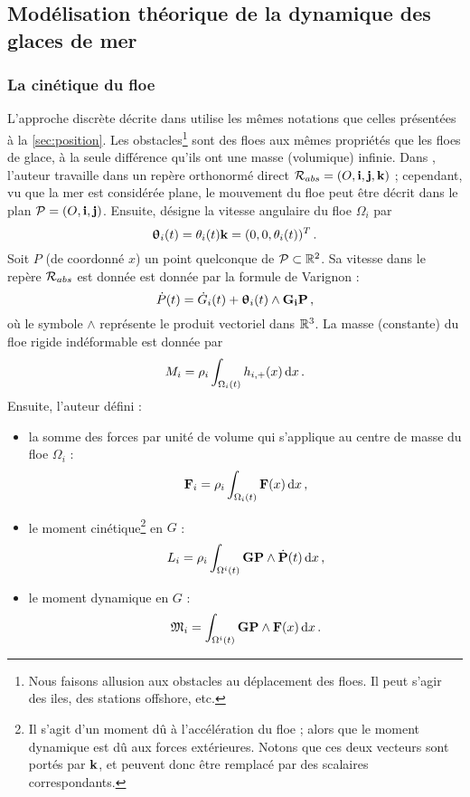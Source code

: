 \subsection{Modélisation théorique de la dynamique des glaces de mer}

\subsubsection{La cinétique du floe}

L'approche discrète décrite dans \parencite{rabatel2015thesis} utilise les mêmes notations que celles présentées à la \cref{sec:position}. Les obstacles\footnote{Nous faisons allusion aux obstacles au déplacement des floes. Il peut s'agir des iles, des stations offshore, etc.} sont des floes aux mêmes propriétés que les floes de glace, à la seule différence qu'ils ont une masse (volumique) infinie. Dans \parencite{rabatel2015thesis}, l'auteur travaille dans un repère orthonormé direct $\mathcal{R}_{abs} = (O, \bm{\mathrm{i}}, \bm{\mathrm{j}}, \bm{\mathrm{k}})$ ; cependant, vu que la mer est considérée plane, le mouvement du floe peut être décrit dans le plan $\mathcal{P} = (O, \bm{\mathrm{i}}, \bm{\mathrm{j}})$. Ensuite, \citeauthor{rabatel2015thesis} désigne la vitesse angulaire du floe $\Omega_i$ par 
$$
\bm{\mathrm{\uptheta}}_i(t) = \theta_i(t)\bm{\mathrm{k}} = (0,0,\theta_i(t))^T \,.
$$
Soit $P$ (de coordonné $x$) un point quelconque de $\mathcal{P} \subset \mathbb{R}^2$. Sa vitesse dans le repère $\mathcal{R}_{abs}$ est donnée est donnée par la formule de Varignon :
$$
\dot{P}(t) = \dot{G}_i(t) + \bm{\uptheta}_i(t) \wedge \bm{\mathrm{G_iP}} \,,
$$
où le symbole $\wedge$ représente le produit vectoriel dans $\mathbb{R}^3$. La masse (constante) du floe rigide indéformable est donnée par 
$$
M_i = \rho_i \int_{\Omega_i(t)} h_{i, +} (x) \diff x \,.
$$
Ensuite, l'auteur défini :
\begin{itemize}
    \item la somme des forces par unité de volume qui s'applique au centre de masse du floe $\Omega_i$ : $$\bvec{F}_i = \rho_i \int_{\Omega_i(t)} \bvec{F}(x) \diff x \,,$$
    \item le moment cinétique\footnote{Il s'agit d'un moment dû à l'accélération du floe ; alors que le moment dynamique est dû aux forces extérieures. Notons que ces deux vecteurs sont portés par $\bm{\mathrm{k}}$, et peuvent donc être remplacé par des scalaires correspondants.} en $G$ : $$L_i = \rho_i \intO{i} \bvec{GP} \wedge \dot{\bvec{P}}(t) \diff x \,,$$
    \item le moment dynamique en $G$ : $$\mathfrak{M}_i = \intO{i} \bvec{GP} \wedge \bvec{F}(x) \diff x \,.$$
\end{itemize}
